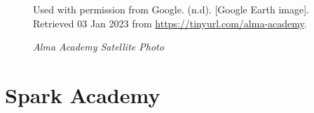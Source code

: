 \begin{figure}[hbtp]
    \caption[Alma Academy Satellite Photo]{\textit{Alma Academy Satellite Photo}}%
    \label{fig:alma-academy-sat-photo}
    {Used with permission from Google. (n.d). [Google Earth image]. Retrieved 03 Jan 2023 from \url{https://tinyurl.com/alma-academy}.}
\end{figure}


\clearpage
\section{Spark Academy}\label{sec:spark-academy-info}\indent

